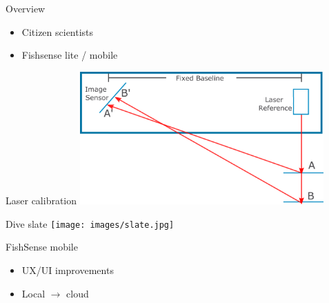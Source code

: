 
\begin{frame}{Overview}
    \begin{itemize}
        \item Citizen scientists
        \item Fishsense lite / mobile
    \end{itemize}  
\end{frame}

\begin{frame}{Laser calibration}
    \centering
    \includegraphics[height=0.7\textheight,width=0.7\textwidth,keepaspectratio]{images/fs_triangulation.png}
\end{frame}

\begin{frame}{Dive slate}
    \centering
    \texttt{[image: images/slate.jpg]}
\end{frame}

\begin{frame}{FishSense mobile}
    \begin{itemize}
        \item UX/UI improvements
        \item Local $\rightarrow$ cloud
    \end{itemize}
\end{frame}



